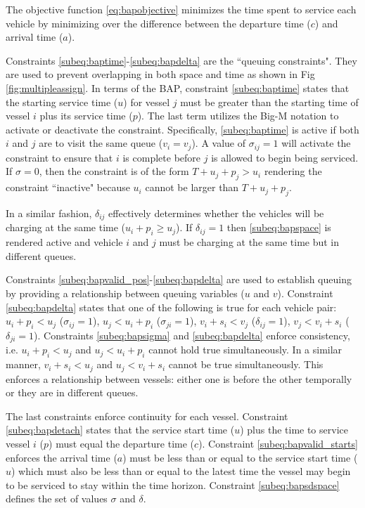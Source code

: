 \documentclass[letterpaper, 10pt, conference]{IEEEtran}
\begin{document}
The objective function \eqref{eq:bapobjective} minimizes the time spent to service each vehicle by minimizing over the difference between the departure time (\(c\)) and arrival time (\(a\)).

Constraints \ref{subeq:baptime}-\ref{subeq:bapdelta} are the ``queuing constraints". They are used to prevent overlapping in both space and time as shown in Fig \ref{fig:multipleassign}. In terms of the BAP, constraint \eqref{subeq:baptime} states that the starting service time (\(u\)) for vessel \(j\) must be greater than the starting time of vessel \(i\) plus its service time (\(p\)). The last term utilizes the Big-M notation to activate or deactivate the constraint. Specifically, \eqref{subeq:baptime} is active if both \(i\) and \(j\) are to visit the same queue (\(v_i = v_j\)). A value of \(\sigma_{ij} = 1\) will activate the constraint to ensure that \(i\) is complete before \(j\) is allowed to begin being serviced. If \(\sigma = 0\), then the constraint is of the form \(T + u_j + p_j > u_i\) rendering the constraint ``inactive" because \(u_i\) cannot be larger than \(T + u_j + p_j\).

In a similar fashion, \(\delta_{ij}\) effectively determines whether the vehicles will be charging at the same time (\(u_i + p_i \geq u_j\)). If \(\delta_{ij} = 1\) then \eqref{subeq:bapspace} is rendered active and vehicle \(i\) and \(j\) must be charging at the same time but in different queues.

Constraints \ref{subeq:bapvalid_pos}-\ref{subeq:bapdelta} are used to establish queuing by providing a relationship between queuing variables (\(u\) and \(v\)). Constraint \eqref{subeq:bapdelta} states that one of the following is true for each vehicle pair: \(u_i + p_i < u_j\) (\(\sigma_{ij} = 1\)), \(u_j < u_i + p_i\) (\(\sigma_{ji} = 1\)), \(v_i + s_i < v_j\) (\(\delta_{ij} = 1\)), \(v_j < v_i + s_i\) (\(\delta_{ji} = 1\)). Constraints \eqref{subeq:bapsigma} and \eqref{subeq:bapdelta} enforce consistency, i.e. \(u_i + p_i < u_j\) and \(u_j < u_i + p_i\) cannot hold true simultaneously. In a similar manner, \(v_i + s_i < u_j\) and \(u_j < v_i + s_i\) cannot be true simultaneously. This enforces a relationship between vessels: either one is before the other temporally or they are in different queues.

The last constraints enforce continuity for each vessel. Constraint \eqref{subeq:bapdetach} states that the service start time (\(u\)) plus the time to service vessel \(i\) (\(p\)) must equal the departure time (\(c\)). Constraint \eqref{subeq:bapvalid_starts} enforces the arrival time (\(a\)) must be less than or equal to the service start time (\(u\)) which must also be less than or equal to the latest time the vessel may begin to be serviced to stay within the time horizon. Constraint \eqref{subeq:bapsdspace} defines the set of values \(\sigma\) and \(\delta\).
\end{document}
